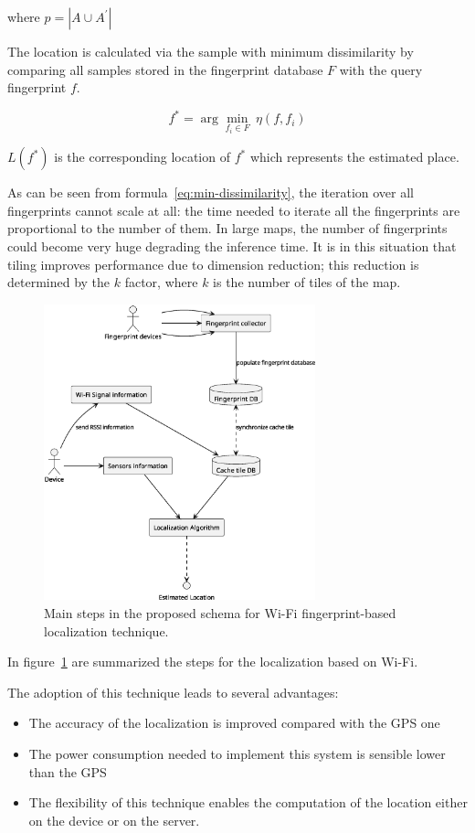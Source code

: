where $p = | A \cup A^{'} |$

The location is calculated via the sample with minimum dissimilarity by comparing all samples stored in the fingerprint database $F$ with the query
fingerprint $f$.

\begin{equation}
	f^{*} = \arg \min_{f_i \in F} \ \eta(f, f_i)
	\label{eq:min-dissimilarity}
\end{equation}

$L(f^{*})$ is the corresponding location of $f^{*}$ which represents the estimated place.

As can be seen from formula~\ref{eq:min-dissimilarity}, the iteration over all fingerprints cannot scale at all: the time needed to iterate all
the fingerprints are proportional to the number of them. In large maps, the number of fingerprints could become very huge degrading the inference
time. It is in this situation that tiling improves performance due to dimension reduction; this reduction is determined by the $k$ factor, where
$k$ is the number of tiles of the map.

\begin{figure}[H]
	\centering
	\includegraphics[width=0.7\textwidth]{img/fingerprint-schema.eps}
	\caption{Main steps in the proposed schema for Wi-Fi fingerprint-based localization technique.}
	\label{fig:fingerprint-schema}
\end{figure}

In figure~\ref{fig:fingerprint-schema} are summarized the steps for the localization based on Wi-Fi.

The adoption of this technique leads to several advantages:
\begin{itemize}
	\item The accuracy of the localization is improved compared with the GPS one~\cite{du2018hybrid}
	\item The power consumption needed to implement this system is sensible lower than the GPS~\cite{du2018hybrid}
	\item The flexibility of this technique enables the computation of the location either on the device or on the server.
\end{itemize}

